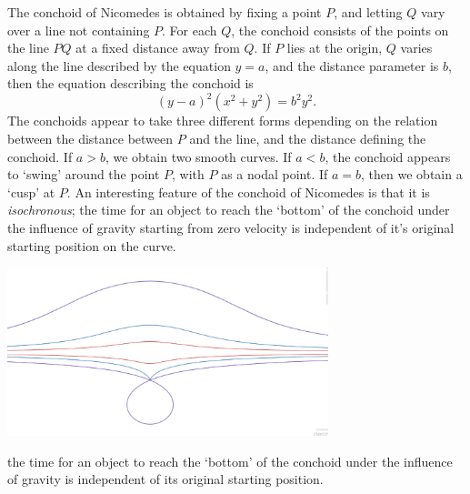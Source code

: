 \begin{example}
    The conchoid of Nicomedes is obtained by fixing a point $P$, and letting $Q$ vary over a line not containing $P$. For each $Q$, the conchoid consists of the points on the line $PQ$ at a fixed distance away from $Q$. If $P$ lies at the origin, $Q$ varies along the line described by the equation $y = a$, and the distance parameter is $b$, then the equation describing the conchoid is
    \[ (y-a)^2(x^2 + y^2) = b^2y^2. \]
    The conchoids appear to take three different forms depending on the relation between the distance between $P$ and the line, and the distance defining the conchoid. If $a > b$, we obtain two smooth curves. If $a < b$, the conchoid appears to `swing' around the point $P$, with $P$ as a nodal point. If $a = b$, then we obtain a `cusp' at $P$. An interesting feature of the conchoid of Nicomedes is that it is \emph{isochronous}; the time for an object to reach the `bottom' of the conchoid under the influence of gravity starting from zero velocity is independent of it's original starting position on the curve.
    \begin{center}
        \includegraphics[width=0.7\textwidth]{ConchoidNicomedes.png}
    \end{center}
    the time for an object to reach the `bottom' of the conchoid under the influence of gravity is independent of its original starting position.
\end{example}

